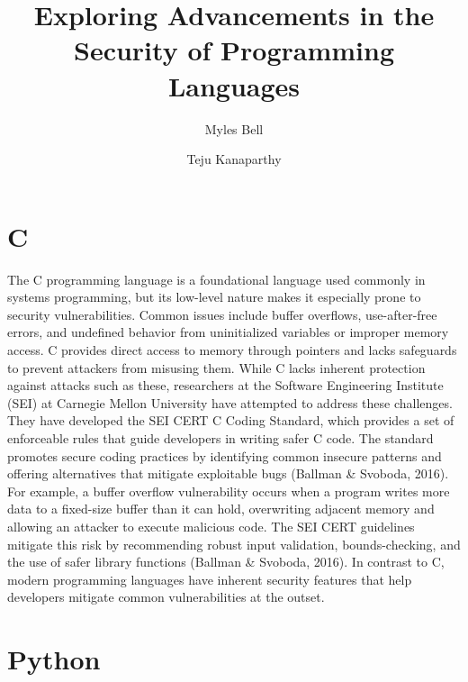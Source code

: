 \documentclass[11pt]{article}
\title{Exploring Advancements in the Security of Programming Languages}
\author{Myles Bell \and Teju Kanaparthy}
\date{}
\begin{document}
\maketitle

\section*{C}

The C programming language is a foundational language used commonly in systems programming, but its low-level nature makes it especially prone to security vulnerabilities. Common issues include buffer overflows, use-after-free errors, and undefined behavior from uninitialized variables or improper memory access. C provides direct access to memory through pointers and lacks safeguards to prevent attackers from misusing them. While C lacks inherent protection against attacks such as these, researchers at the Software Engineering Institute (SEI) at Carnegie Mellon University have attempted to address these challenges. They have developed the SEI CERT C Coding Standard, which provides a set of enforceable rules that guide developers in writing safer C code. The standard promotes secure coding practices by identifying common insecure patterns and offering alternatives that mitigate exploitable bugs (Ballman \& Svoboda, 2016). For example, a buffer overflow vulnerability occurs when a program writes more data to a fixed-size buffer than it can hold, overwriting adjacent memory and allowing an attacker to execute malicious code. The SEI CERT guidelines mitigate this risk by recommending robust input validation, bounds-checking, and the use of safer library functions (Ballman \& Svoboda, 2016). In contrast to C, modern programming languages have inherent security features that help developers mitigate common vulnerabilities at the outset.

\section*{Python}
\end{document}
